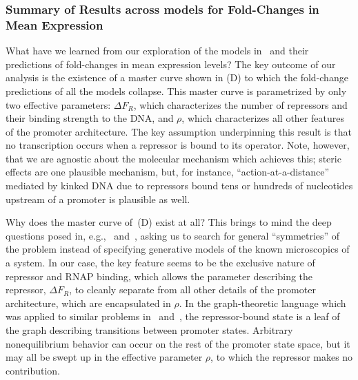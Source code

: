 \subsubsection{Summary of Results across models for Fold-Changes in Mean
Expression}
What have we learned from our exploration of the models
in~ and their predictions of fold-changes in mean
expression levels? The key outcome of our analysis is the existence of a master
curve shown in (D) to which the fold-change predictions
of all the models collapse. This master curve is parametrized by only two
effective parameters: $\Delta F_R$, which characterizes the number of repressors
and their binding strength to the DNA, and $\rho$, which characterizes all other
features of the promoter architecture. The key assumption underpinning this
result is that no transcription occurs when a repressor is bound to its
operator. Note, however, that we are agnostic about the molecular mechanism
which achieves this; steric effects are one plausible mechanism, but, for
instance, ``action-at-a-distance'' mediated by kinked DNA due to repressors
bound tens or hundreds of nucleotides upstream of a promoter is plausible as
well.

Why does the master curve of~(D) exist at all? This
brings to mind the deep questions posed in, e.g.,~\cite{Frank2013}
and~\cite{Frank2014a}, asking us to search for general ``symmetries'' of the
problem instead of specifying generative models of the known microscopics of a
system. In our case, the key feature seems to be the exclusive nature of
repressor and RNAP binding, which allows the parameter describing the repressor,
$\Delta F_R$, to cleanly separate from all other details of the promoter
architecture, which are encapsulated in $\rho$. In the graph-theoretic language
which was applied to similar problems in~\cite{Gunawardena2012}
and~\cite{Ahsendorf2014}, the repressor-bound state is a leaf of the graph
describing transitions between promoter states. Arbitrary nonequilibrium
behavior can occur on the rest of the promoter state space, but it may all be
swept up in the effective parameter $\rho$, to which the repressor makes no
contribution.

